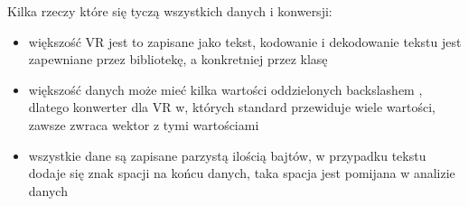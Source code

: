 \par
Kilka rzeczy które się tyczą wszystkich danych i konwersji:
\begin{itemize}
    \item większość VR jest to zapisane jako tekst, kodowanie i dekodowanie tekstu jest zapewniane przez bibliotekę, a konkretniej przez klasę 
    \item większość danych może mieć kilka wartości oddzielonych backslashem \quotett{\textbackslash}, dlatego konwerter dla VR w, których standard przewiduje wiele wartości, zawsze zwraca wektor z tymi wartościami
    \item wszystkie dane są zapisane parzystą ilością bajtów, w przypadku tekstu dodaje się znak spacji na końcu danych, taka spacja jest pomijana w analizie danych
\end{itemize}

